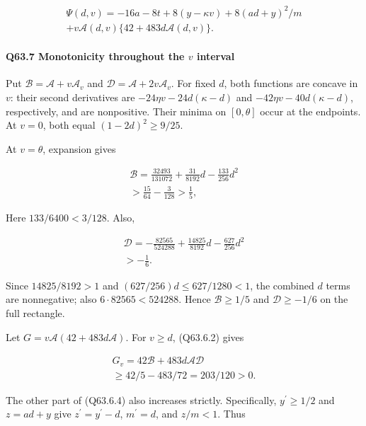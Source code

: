 \[
\begin{gathered}
\Psi(d,v)=-16a-8t+8(y-\kappa v)+8(ad+y)^2/m\\
+v\mathcal A(d,v)\{42+483d\mathcal A(d,v)\}.
\end{gathered}\tag{Q63.6.4}\label{eq:Q63:Q63:6:4}
\]

\paragraph{Q63.7 Monotonicity throughout the $v$ interval}

Put $\mathcal B=\allowbreak \mathcal A+v\mathcal A_v$ and $\mathcal D=\allowbreak \mathcal A+2v\mathcal A_v$.
For fixed $d$, both functions are concave in $v$: their second derivatives are
$-24\eta v-24d(\kappa-d)$ and $-42\eta v-40d(\kappa-d)$, respectively, and are nonpositive.
Their minima on $[0,\allowbreak  \theta]$ occur at the endpoints.
At $v=\allowbreak 0$, both equal $(1-2d)^2\ge\allowbreak 9/25$.

At $v=\allowbreak \theta$, expansion gives

\[
\begin{gathered}
\mathcal B=\frac{32493}{131072}+\frac{31}{8192}d-\frac{133}{256}d^2\\
>\frac{15}{64}-\frac3{128}>\frac15,
\end{gathered}
\]

Here $133/6400<\allowbreak 3/128$. Also,

\[
\begin{gathered}
\mathcal D=-\frac{82565}{524288}+\frac{14825}{8192}d-\frac{627}{256}d^2\\
>-\frac16.
\end{gathered}
\]

Since $14825/8192>\allowbreak 1$ and $(627/256)d\le\allowbreak 627/1280<\allowbreak 1$, the combined $d$ terms are nonnegative;
also $6\cdot82565<\allowbreak 524288$. Hence $\mathcal B\ge\allowbreak 1/5$ and $\mathcal D\ge\allowbreak -1/6$ on the full rectangle.

Let $G=\allowbreak v\mathcal A(42+483d\mathcal A)$. For $v\ge\allowbreak  d$, (Q63.6.2) gives

\[
\begin{gathered}
G_v=42\mathcal B+483d\mathcal A\mathcal D\\
\ge42/5-483/72=203/120>0.
\end{gathered}\tag{Q63.7.1}\label{eq:Q63:Q63:7:1}
\]

The other part of (Q63.6.4) also increases strictly. Specifically, $y^\prime\ge\allowbreak 1/2$ and $z=\allowbreak ad+y$ give $z^\prime=\allowbreak y^\prime-d$,
$m^\prime=\allowbreak d$, and $z/m<\allowbreak 1$. Thus

